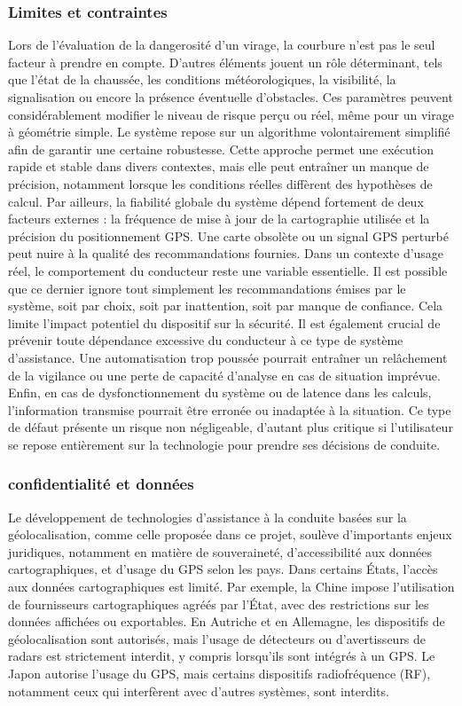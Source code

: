 \subsubsection{Limites et contraintes}
Lors de l’évaluation de la dangerosité d’un virage, la courbure n’est pas le seul facteur à prendre en compte. D’autres éléments jouent un rôle déterminant, tels que l’état de la chaussée, les conditions météorologiques, la visibilité, la signalisation ou encore la présence éventuelle d’obstacles. Ces paramètres peuvent considérablement modifier le niveau de risque perçu ou réel, même pour un virage à géométrie simple.
Le système repose sur un algorithme volontairement simplifié afin de garantir une certaine robustesse. Cette approche permet une exécution rapide et stable dans divers contextes, mais elle peut entraîner un manque de précision, notamment lorsque les conditions réelles diffèrent des hypothèses de calcul. Par ailleurs, la fiabilité globale du système dépend fortement de deux facteurs externes : la fréquence de mise à jour de la cartographie utilisée et la précision du positionnement GPS. Une carte obsolète ou un signal GPS perturbé peut nuire à la qualité des recommandations fournies.
Dans un contexte d’usage réel, le comportement du conducteur reste une variable essentielle. Il est possible que ce dernier ignore tout simplement les recommandations émises par le système, soit par choix, soit par inattention, soit par manque de confiance. Cela limite l’impact potentiel du dispositif sur la sécurité.
Il est également crucial de prévenir toute dépendance excessive du conducteur à ce type de système d’assistance. Une automatisation trop poussée pourrait entraîner un relâchement de la vigilance ou une perte de capacité d’analyse en cas de situation imprévue. Enfin, en cas de dysfonctionnement du système ou de latence dans les calculs, l’information transmise pourrait être erronée ou inadaptée à la situation. Ce type de défaut présente un risque non négligeable, d’autant plus critique si l’utilisateur se repose entièrement sur la technologie pour prendre ses décisions de conduite.

\subsubsection{confidentialité et données}
Le développement de technologies d’assistance à la conduite basées sur la géolocalisation, comme celle proposée dans ce projet, soulève d’importants enjeux juridiques, notamment en matière de souveraineté, d’accessibilité aux données cartographiques, et d’usage du GPS selon les pays.
Dans certains États, l’accès aux données cartographiques est limité. Par exemple, la Chine impose l’utilisation de fournisseurs cartographiques agréés par l’État, avec des restrictions sur les données affichées ou exportables. En Autriche et en Allemagne, les dispositifs de géolocalisation sont autorisés, mais l’usage de détecteurs ou d'avertisseurs de radars est strictement interdit, y compris lorsqu'ils sont intégrés à un GPS. Le Japon autorise l’usage du GPS, mais certains dispositifs radiofréquence (RF), notamment ceux qui interfèrent avec d'autres systèmes, sont interdits.

